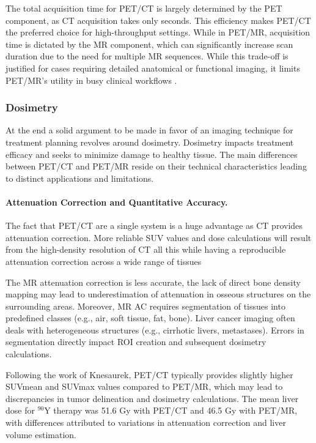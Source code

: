 \documentclass[11pt]{article} %
\begin{document}
\begin{multicols}{2}
The total acquisition time for PET/CT is largely determined by the PET component, as CT acquisition takes only seconds. This efficiency makes PET/CT the preferred choice for high-throughput settings\cite{knesaurek2018}.
While in PET/MR, acquisition time is dictated by the MR component, which can significantly increase scan duration due to the need for multiple MR sequences. While this trade-off is justified for cases requiring detailed anatomical or functional imaging, it limits PET/MR’s utility in busy clinical workflows \cite{knesaurek2018}.


\subsubsection{Dosimetry}
At the end a solid argument to be made in favor of an imaging technique for treatment planning revolves around dosimetry. Dosimetry impacts treatment efficacy and seeks to minimize damage to healthy tissue. The main differences between PET/CT and PET/MR reside on their technical characteristics leading to distinct applications and limitations.

\paragraph{Attenuation Correction and Quantitative Accuracy.}

The fact that PET/CT are a single system is a huge advantage as CT provides attenuation correction. More reliable SUV values and dose calculations will result from the high-density resolution of CT all this while having a reproducible attenuation correction across a wide range of tissues

The MR attenuation correction is less accurate, the lack of direct bone density mapping may lead to underestimation of attenuation in osseous structures on the surrounding areas. Moreover, MR AC requires segmentation of tissues into predefined classes (e.g., air, soft tissue, fat, bone). Liver cancer imaging often deals with heterogeneous structures (e.g., cirrhotic livers, metastases). Errors in segmentation directly impact ROI creation and subsequent dosimetry calculations. 


Following the work of Knesaurek, \cite{knesaurek2018} PET/CT typically provides slightly higher SUVmean and SUVmax values compared to PET/MR, which may lead to discrepancies in tumor delineation and dosimetry calculations. The mean liver dose for $^{90}\text{Y}$ therapy was 51.6 Gy with PET/CT and 46.5 Gy with PET/MR, with differences attributed to variations in attenuation correction and liver volume estimation.


\end{multicols}
\end{document}
